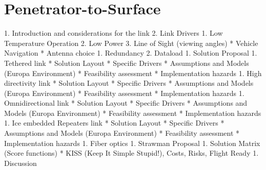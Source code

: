 \section{Penetrator-to-Surface} %

1. Introduction and considerations for the link
2. Link Drivers
   1. Low Temperature Operation
   2. Low Power
   3. Line of Sight (viewing angles)
      * Vehicle Navigation
      * Antenna choice
   1. Redundancy
   2. Dataload
1. Solution Proposal
   1. Tethered link
      * Solution Layout
         * Specific Drivers
      * Assumptions and Models (Europa Environment)
      * Feasibility assessment
      * Implementation hazards
   1. High directivity link
      * Solution Layout
         * Specific Drivers
      * Assumptions and Models (Europa Environment)
      * Feasibility assessment
      * Implementation hazards
   1. Omnidirectional link
      * Solution Layout
         * Specific Drivers
      * Assumptions and Models (Europa Environment)
      * Feasibility assessment
      * Implementation hazards
   1. Ice embedded Repeaters link
      * Solution Layout
         * Specific Drivers
      * Assumptions and Models (Europa Environment)
      * Feasibility assessment
      * Implementation hazards
    1. Fiber optics
1. Strawman Proposal
   1. Solution Matrix (Score functions)
      * KISS (Keep It Simple Stupid!), Costs, Risks, Flight Ready
   1. Discussion